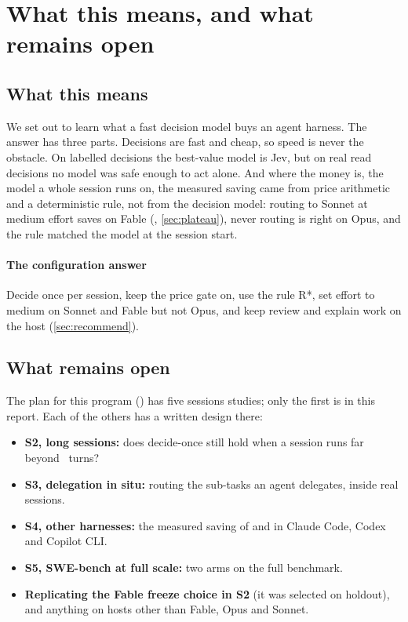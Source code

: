 \section{What this means, and what remains open}\label{sec:limits}

\subsection{What this means}

We set out to learn what a fast decision model buys an agent harness. The answer has three parts. Decisions are fast
and cheap, so speed is never the obstacle. On labelled decisions the best-value model is Jev, but on real read
decisions no model was safe enough to act alone. And where the money is, the model a whole session runs on, the
measured saving came from price arithmetic and a deterministic rule, not from the decision model: routing to Sonnet
at medium effort saves on Fable (\SHOneRatio\X, \cref{sec:plateau}), never routing is right on Opus, and the rule
matched the model at the session start.

\paragraph{The configuration answer} Decide once per session, keep the price gate on, use the rule R*, set effort to
medium on Sonnet and Fable but not Opus, and keep review and explain work on the host (\cref{sec:recommend}).

\subsection{What remains open}


The plan for this program () has five sessions studies; only the first is in this
report. Each of the others has a written design there:
\begin{itemize}
  \item \textbf{S2, long sessions:} does decide-once still hold when a session runs far beyond \MaxTurns\ turns?
  \item \textbf{S3, delegation in situ:} routing the sub-tasks an agent delegates, inside real sessions.
  \item \textbf{S4, other harnesses:} the measured saving of  and  in Claude Code, Codex
    and Copilot CLI.
  \item \textbf{S5, SWE-bench at full scale:} two arms on the full benchmark.
  \item \textbf{Replicating the Fable freeze choice in S2} (it was selected on holdout), and anything on hosts other
    than Fable, Opus and Sonnet.
\end{itemize}

